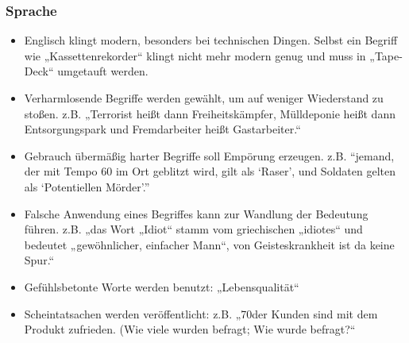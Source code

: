 \subsubsection{Sprache}
\begin{itemize}
	\item Englisch klingt modern, besonders bei technischen Dingen. Selbst ein Begriff wie
„Kassettenrekorder“ klingt nicht mehr modern genug und muss in „Tape-Deck“ umgetauft werden.

	\item Verharmlosende Begriffe werden gewählt, um auf weniger Wiederstand zu stoßen.
z.B. „Terrorist heißt dann Freiheitskämpfer, Mülldeponie heißt dann Entsorgungspark und Fremdarbeiter
heißt Gastarbeiter.“

	\item Gebrauch übermäßig harter Begriffe soll Empörung erzeugen.
z.B. \enquote{jemand, der mit Tempo 60 im Ort geblitzt wird, gilt als \enquote{Raser}, und Soldaten
gelten als \enquote{Potentiellen Mörder}.}

	\item Falsche Anwendung eines Begriffes kann zur Wandlung der Bedeutung führen.
z.B. „das Wort „Idiot“ stamm vom griechischen „idiotes“ und bedeutet „gewöhnlicher, einfacher Mann“,
von Geisteskrankheit ist da keine Spur.“

	\item Gefühlsbetonte Worte werden benutzt: „Lebensqualität“
	\item Scheintatsachen werden veröffentlicht:
z.B. „70\Prozent der Kunden sind mit dem Produkt zufrieden. (Wie viele wurden befragt; Wie wurde
befragt?“
\end{itemize}

